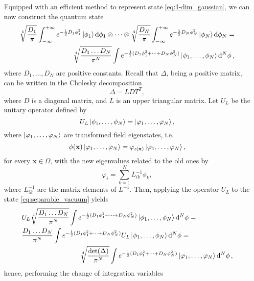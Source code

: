 \documentclass[a4paper,10pt]{report}
\begin{document}
Equipped with an efficient method to represent state \eqref{eq:1-dim_gaussian}, we can now construct the quantum state
\begin{align}
\sqrt[4]{\frac{D_1}{\pi}}\int_{-\infty}^{+\infty}e^{-\frac{1}{2}D_1\phi_1^2}\ket{\phi_1}\dd{\phi_1}\otimes\dots\otimes\sqrt[4]{\frac{D_N}{\pi}}\int_{-\infty}^{+\infty}e^{-\frac{1}{2}D_N\phi_N^2}\ket{\phi_N}\dd{\phi_N} = \nonumber\\
\sqrt[4]{\frac{D_1\dots D_N}{\pi^N}}\int e^{-\frac{1}{2}(D_1\phi_1^2+\dots+D_N\phi_N^2)}\ket{\phi_1,\dots,\phi_N}\dd[N]{\phi},
\label{eq:separable_vacuum}
\end{align}
where $D_1,\dots,D_N$ are positive constants. Recall that $\Delta$, being a positive matrix, can be written in the Cholesky decomposition
\begin{equation}
\Delta = LDT^T,
\end{equation}
where $D$ is a diagonal matrix, and $L$ is an upper triangular matrix. Let $U_L$ be the unitary operator defined by
\begin{equation}
U_L\ket{\phi_1,\dots,\phi_N} = \ket{\varphi_1,\dots,\varphi_N},
\end{equation}
where $\ket{\varphi_1,\dots,\varphi_N}$ are transformed field eigenstates, i.e.
\begin{equation}
\phi(\mathbf{x})\ket{\varphi_1,\dots,\varphi_N} = \varphi_{\iota(\mathbf{x})}\ket{\varphi_1,\dots,\varphi_N},
\end{equation}
for every $\mathbf{x}\in\Omega$, with the new eigenvalues related to the old ones by 
\begin{equation}
\varphi_i = \sum_{k=1}^NL^{-1}_{ik}\phi_k,
\end{equation}
where $L^{-1}_{ik}$ are the matrix elements of $L^{-1}$.
Then, applying the operator $U_L$ to the state \eqref{eq:separable_vacuum} yields
\begin{align}
&U_L\sqrt[4]{\frac{D_1\dots D_N}{\pi^N}}\int e^{-\frac{1}{2}(D_1\phi_1^2+\dots+D_N\phi_N^2)}\ket{\phi_1,\dots,\phi_N}\dd[N]{\phi} = \nonumber\\
&{\frac{D_1\dots D_N}{\pi^N}}\int e^{-\frac{1}{2}(D_1\phi_1^2+\dots+D_N\phi_N^2)}U_L\ket{\phi_1,\dots,\phi_N}\dd[N]{\phi} = \nonumber\\
&\hspace{3cm}\sqrt[4]{\frac{\det(\Delta)}{\pi^N}}\int e^{-\frac{1}{2}(D_1\phi_1^2+\dots+D_N\phi_N^2)}\ket{\varphi_1,\dots,\varphi_N}\dd[N]{\phi},
\label{eq:roatated_gaussian}
\end{align}
hence, performing the change of integration variables
\end{document}
